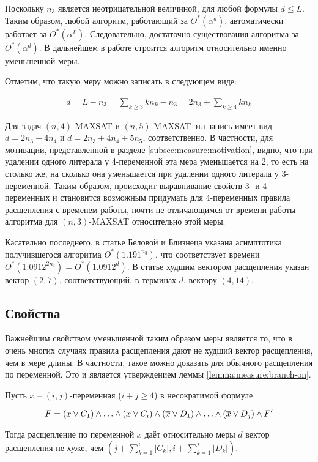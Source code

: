 Поскольку $n_3$ является неотрицательной величиной, для любой формулы $d \leq L$. Таким образом, любой алгоритм, работающий за $O^*(\alpha^d)$, автоматически работает за $O^*(\alpha^L)$. Следовательно, достаточно существования алгоритма за $O^*(\alpha^d)$. В дальнейшем в работе строится алгоритм относительно именно уменьшенной меры.

Отметим, что такую меру можно записать в следующем виде:

\begin{gather}
 d = L - n_3 = \sum_{k \geq 3} kn_k - n_3 = 2n_3 + \sum_{k \geq 4} kn_k
 \label{formula:discounted-length}
\end{gather}

Для задач $(n,4)$-MAXSAT и $(n,5)$-MAXSAT эта запись имеет вид $d = 2n_3 + 4n_4$ и $d = 2n_3 + 4n_4 + 5n_5$, соответственно. В частности, для мотивации, представленной в разделе \ref{subsec:measure:motivation}, видно, что при удалении одного литерала у 4-переменной эта мера уменьшается на 2, то есть на столько же, на сколько она уменьшается при удалении одного литерала у 3-переменной. Таким образом, происходит выравнивание свойств 3- и 4-переменных и становится возможным придумать для 4-переменных правила расщепления с временем работы, почти не отличающимся от времени работы алгоритма для $(n,3)$-MAXSAT относительно этой меры.

Касательно последнего, в статье Беловой и Близнеца \cite{belova18} указана асимптотика получившегося алгоритма $O^*(1.191^{n_3})$, что соответствует времени $O^*(1.0912^{2n_3}) = O^*(1.0912^d)$. В статье худшим вектором расщепления указан вектор $(2,7)$, соответствующий, в терминах $d$, вектору $(4,14)$.

\subsection{Свойства}
\label{subsec:measure:properties}

\firstpar{}Важнейшим свойством уменьшенной таким образом меры является то, что в очень многих случаях правила расщепления дают не худший вектор расщепления, чем в мере длины. В частности, такое можно доказать для обычного расщепления по переменной. Это и является утверждением леммы \ref{lemma:measure:branch-on}.

\begin{lemma}
 Пусть $x$ -- $(i,j)$-переменная ($i + j \geq 4$) в несократимой формуле

 $$
  F =
  (x \vee C_1) \wedge
  \ldots \wedge
  (x \vee C_i) \wedge
  (\overline{x} \vee D_1) \wedge
  \ldots \wedge
  (\overline{x} \vee D_j) \wedge
  F'
 $$

 Тогда расщепление по переменной $x$ даёт относительно меры $d$ вектор расщепления не хуже, чем $(j + \sum\limits_{k=1}^i |C_k|, i + \sum\limits_{k=1}^j |D_k|)$.
 \label{lemma:measure:branch-on}
\end{lemma}

